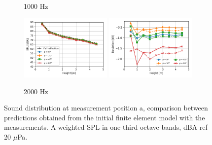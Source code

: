 \begin{figure}[H]
\begin{subfigure}[b]{\textwidth}
		\caption{1000 Hz}
	\end{subfigure}
	\begin{subfigure}[b]{\textwidth}
		\centering
		\includegraphics[width=0.49\textwidth]{fig/chap5/impedance/third_octave/SPL_2000_Hz.png}
		\includegraphics[width=0.49\textwidth]{fig/chap5/impedance/third_octave/deviation_2000_Hz.png}
		\caption{2000 Hz}
	\end{subfigure}

	\caption{Sound distribution at measurement position a, comparison between predictions obtained from the initial finite element model with the measurements. A-weighted SPL in one-third octave bands, dBA ref 20 $\mu$Pa.}
	\label{fig:third_octave_over_height_impedance}
\end{figure}

